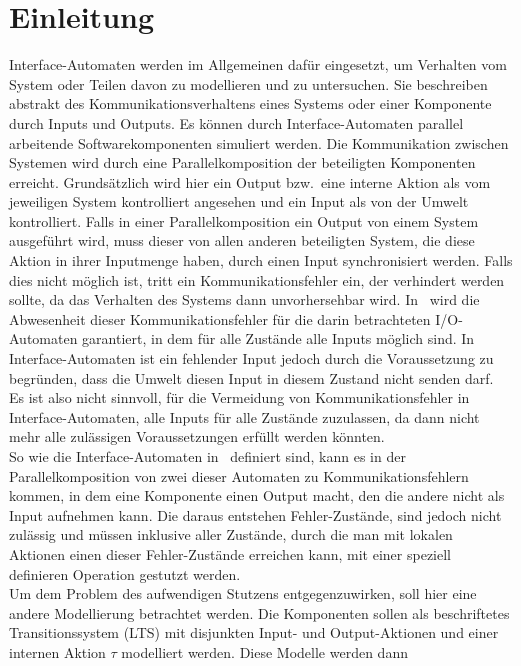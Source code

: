 \chapter{Einleitung}

Interface-Automaten werden im Allgemeinen dafür eingesetzt, um Verhalten vom
System oder Teilen davon zu modellieren und zu
untersuchen. Sie beschreiben abstrakt des Kommunikationsverhaltens
eines Systems oder einer Komponente durch Inputs und Outputs. Es können durch
Interface-Automaten
parallel arbeitende Softwarekomponenten simuliert werden. Die Kommunikation
zwischen  Systemen wird durch eine Parallelkomposition der beteiligten Komponenten
erreicht. Grundsätzlich wird hier ein Output bzw.\ eine
interne Aktion als vom jeweiligen System
kontrolliert angesehen und ein Input als von der Umwelt kontrolliert. Falls in
einer Parallelkomposition ein Output von einem System ausgeführt wird, muss
dieser von allen anderen beteiligten System, die diese Aktion in ihrer
Inputmenge haben, durch einen
Input synchronisiert werden. Falls dies nicht möglich ist, tritt ein
Kommunikationsfehler ein, der verhindert werden sollte, da das
Verhalten des Systems dann unvorhersehbar wird. In~\cite{Lynch1996} wird die
Abwesenheit dieser Kommunikationsfehler
für die darin betrachteten I/O-Automaten garantiert, in dem für alle Zustände alle Inputs möglich
sind. In Interface-Automaten ist ein fehlender Input jedoch durch die
Voraussetzung zu begründen, dass die Umwelt diesen Input in diesem Zustand nicht senden
darf. Es ist also nicht sinnvoll, für die Vermeidung von Kommunikationsfehler
in Interface-Automaten, alle Inputs für alle Zustände zuzulassen, da dann nicht
mehr alle zulässigen Voraussetzungen erfüllt werden könnten.\\
So wie die Interface-Automaten in~\cite{Alfaro2004} definiert sind, kann es
in der Parallelkomposition von zwei dieser Automaten zu Kommunikationsfehlern
kommen, in dem eine Komponente einen Output macht, den die andere nicht als Input
aufnehmen kann. Die daraus entstehen Fehler-Zustände, sind jedoch nicht
zulässig und müssen inklusive aller Zustände, durch die man mit lokalen
Aktionen einen dieser Fehler-Zustände erreichen kann, mit einer speziell definieren
Operation gestutzt werden.\\
Um dem Problem des aufwendigen Stutzens entgegenzuwirken, soll hier eine
andere Modellierung betrachtet werden. Die Komponenten sollen als beschriftetes
Transitionssystem (LTS) mit disjunkten Input- und Output-Aktionen und einer
internen Aktion $\tau$ modelliert werden. Diese Modelle werden dann

